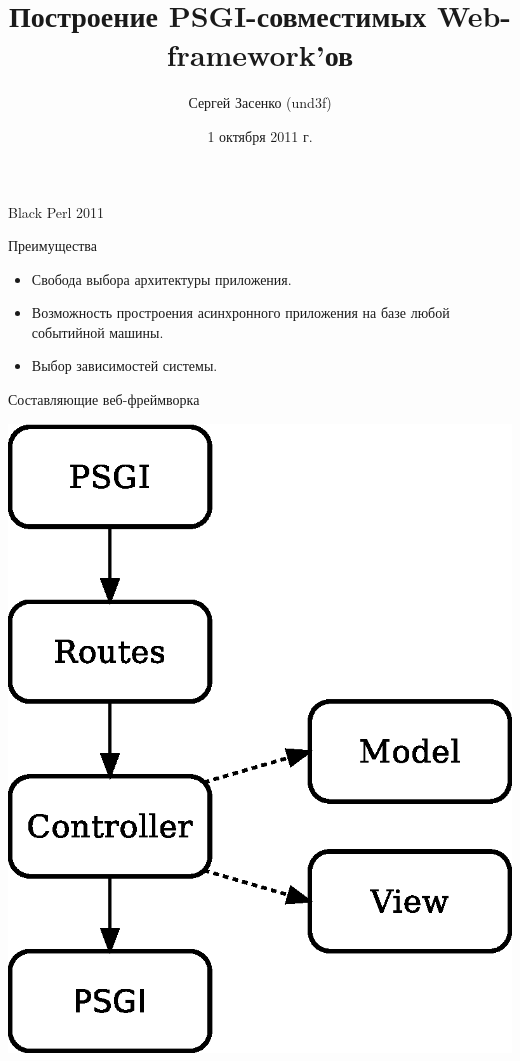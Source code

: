 \documentclass[17pt]{beamer}
\title{Построение PSGI-совместимых Web-framework'ов}
\author{Сергей Засенко (und3f)}
\date{1 октября 2011 г.}
\begin{document}
\begin{frame}{Black Perl 2011}
\titlepage
\end{frame}

\begin{frame}{Преимущества}

\begin{itemize}
    \item Свобода выбора архитектуры приложения.


    \item Возможность простроения асинхронного приложения на базе любой
событийной машины.


    \item Выбор зависимостей системы.
\end{itemize}
\end{frame}

\begin{frame}{Составляющие веб-фреймворка}

\centering
    \includegraphics[height=0.8\textheight]{mvc-scheme}

\end{frame}
\end{document}
